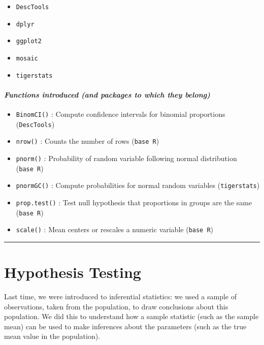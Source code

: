\documentclass[
]{book}
\providecommand{\tightlist}{%
  \setlength{\itemsep}{0pt}\setlength{\parskip}{0pt}}
\begin{document}
\begin{itemize}
\tightlist
\item
  \texttt{DescTools}
\item
  \texttt{dplyr}
\item
  \texttt{ggplot2}
\item
  \texttt{mosaic}
\item
  \texttt{tigerstats}
\end{itemize}

\hypertarget{functions-introduced-and-packages-to-which-they-belong-5}{%
\paragraph*{\texorpdfstring{\emph{Functions introduced (and packages to which they belong)}}{Functions introduced (and packages to which they belong)}}\label{functions-introduced-and-packages-to-which-they-belong-5}}

\begin{itemize}
\tightlist
\item
  \texttt{BinomCI()} : Compute confidence intervals for binomial proportions (\texttt{DescTools})
\item
  \texttt{nrow()} : Counts the number of rows (\texttt{base\ R})
\item
  \texttt{pnorm()} : Probability of random variable following normal distribution (\texttt{base\ R})
\item
  \texttt{pnormGC()} : Compute probabilities for normal random variables (\texttt{tigerstats})
\item
  \texttt{prop.test()} : Test null hypothesis that proportions in groups are the same (\texttt{base\ R})
\item
  \texttt{scale()} : Mean centers or rescales a numeric variable (\texttt{base\ R})
\end{itemize}

\begin{center}\rule{0.5\linewidth}{0.5pt}\end{center}

\hypertarget{hypothesis-testing}{%
\section{Hypothesis Testing}\label{hypothesis-testing}}

Last time, we were introduced to inferential statistics: we used a sample of observations, taken from the population, to draw conclusions about this population. We did this to understand how a sample statistic (such as the sample mean) can be used to make inferences about the parameters (such as the true mean value in the population).
\end{document}

